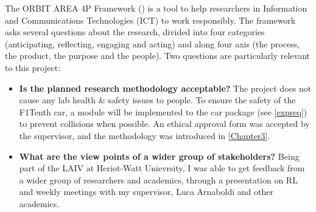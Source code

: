 The ORBIT AREA 4P Framework (\cite{orbit}) is a tool to help researchers in Information and Communications Technologies (ICT) to work responsibly. The framework asks several questions about the research, divided into four categories (anticipating, reflecting, engaging and acting) and along four axis (the process, the product, the purpose and the people). Two questions are particularly relevant to this project:
\begin{itemize}
	\item \textbf{Is the planned research methodology acceptable?} The project does not cause any lab health \& safety issues to people. To ensure the safety of the F1Tenth car, a module will be implemented to the car package (see \ref{expreq}) to prevent collisions when possible. An ethical approval form was accepted by the supervisor, and the methodology was introduced in \ref{Chapter3}.
	\item \textbf{What are the view points of a wider group of stakeholders?} Being part of the LAIV at Heriot-Watt Unievrsity, I was able to get feedback from a wider group of researchers and academics, through a presentation on RL and weekly meetings with my supervisor, Luca Arnaboldi and other academics.
\end{itemize}